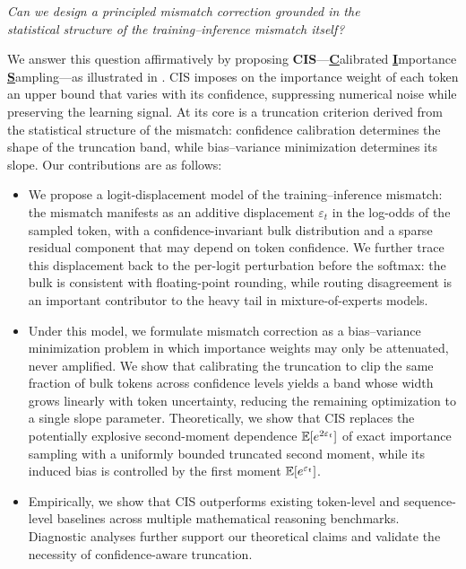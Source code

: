 \begin{center}
\emph{Can we design a principled mismatch correction grounded in the \\
statistical structure of the training--inference mismatch itself?}
\end{center}

We answer this question affirmatively by proposing \textbf{CIS}---\underline{\textbf{C}}alibrated
\underline{\textbf{I}}mportance \underline{\textbf{S}}ampling---as illustrated
in . CIS imposes on the importance weight of each token
an upper bound that varies with its confidence, suppressing numerical noise
while preserving the learning signal. At its core is a truncation criterion
derived from the statistical structure of the mismatch: confidence calibration
determines the shape of the truncation band, while bias--variance minimization
determines its slope. Our contributions are as follows:

\begin{itemize}[leftmargin=*]
\item We propose a logit-displacement model of the training--inference
mismatch: the mismatch manifests as an additive displacement $\varepsilon_t$
in the log-odds of the sampled token, with a confidence-invariant bulk
distribution and a sparse residual component that may depend on token
confidence. We further trace this displacement back to the per-logit
perturbation before the softmax: the bulk is consistent with floating-point
rounding, while routing disagreement is an important contributor to the heavy
tail in mixture-of-experts models.

\item Under this model, we formulate mismatch correction as a bias--variance
minimization problem in which importance weights may only be attenuated, never
amplified. We show that calibrating the truncation to clip the same fraction of
bulk tokens across confidence levels yields a band whose width grows linearly
with token uncertainty, reducing the remaining optimization to a single slope
parameter. Theoretically, we show that CIS replaces the potentially explosive
second-moment dependence $\mathbb{E}[e^{2\varepsilon_t}]$ of exact importance sampling
with a uniformly bounded truncated second moment, while its induced bias is
controlled by the first moment $\mathbb{E}[e^{\varepsilon_t}]$.

\item Empirically, we show that CIS outperforms existing token-level and
sequence-level baselines across multiple mathematical reasoning benchmarks.
Diagnostic analyses further support our theoretical claims and validate the
necessity of confidence-aware truncation.
\end{itemize}

